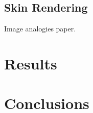 \documentclass[11pt]{report}
\begin{document}
\section{Skin Rendering}

\cite{Hertzmann2001} Image analogies paper.


\chapter{Results}


\chapter{Conclusions}



\end{document}
